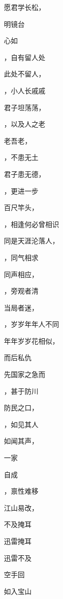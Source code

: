 \documentclass[12pt, a4paper, addpoints, answers]{exam}
\begin{document}
\begin{multicols}{2}
\begin{questions}
\question[2] 愿君学长松，\fillin 

\question[2] \fillin 明镜台

\question[2] 心如\fillin 

\question[2] \fillin ，自有留人处

\question[2] 此处不留人，\fillin 

\question[2] \fillin ，小人长戚戚

\question[2] 君子坦荡荡，\fillin 

\question[2] \fillin ，以及人之老

\question[2] 老吾老，\fillin 

\question[2] \fillin ，不患无土

\question[2] 君子患无德，\fillin 

\question[2] \fillin ，更进一步

\question[2] 百尺竿头，\fillin 

\question[2] \fillin ，相逢何必曾相识

\question[2] 同是天涯沦落人，\fillin 

\question[2] \fillin ，同气相求

\question[2] 同声相应，\fillin 

\question[2] \fillin ，旁观者清

\question[2] 当局者迷，\fillin 

\question[2] \fillin ，岁岁年年人不同

\question[2] 年年岁岁花相似，\fillin 

\question[2] \fillin 而后私仇

\question[2] 先国家之急而\fillin 

\question[2] \fillin ，甚于防川

\question[2] 防民之口，\fillin 

\question[2] \fillin ，如见其人

\question[2] 如闻其声，\fillin 

\question[2] \fillin 一家

\question[2] 自成\fillin 

\question[2] \fillin ，禀性难移

\question[2] 江山易改，\fillin 

\question[2] \fillin 不及掩耳

\question[2] 迅雷\fillin 掩耳

\question[2] 迅雷不及\fillin 

\question[2] \fillin 空手回

\question[2] 如入宝山\fillin 


\end{questions}
\end{multicols}
\end{document}
